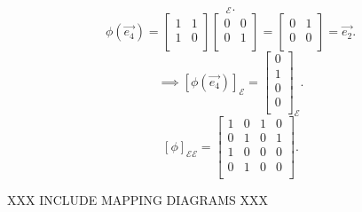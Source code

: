 \documentclass{report}
\begin{document}
{\[        _{ \mathcal{E}} 
        .\]
           \[
           \phi  \left(  \vec{ e_4}  \right) = \begin{bmatrix}
           1 & 1\\
           1 & 0\\
           \end{bmatrix} \begin{bmatrix}
           0 & 0\\
           0 & 1\\
           \end{bmatrix} = \begin{bmatrix}
           0 & 1\\
           0 & 0\\
           \end{bmatrix} = \vec{ e_2} 
           .\] 
           \[
           \implies \left[ \phi \left( \vec{ e_4}  \right)  \right] _{ \mathcal{E}} = \begin{bmatrix}
           0\\
           1\\
           0\\
           0\\
           \end{bmatrix}
            _{ \mathcal{E}}
           .\] 
           \[
            \left[ \phi  \right]_{ \mathcal{E} \mathcal{E}} = \begin{bmatrix}
            1 & 0 & 1 & 0\\
            0 & 1 & 0 & 1\\
            1 & 0 & 0 & 0\\
            0 & 1 & 0 & 0\\
            \end{bmatrix}
           .\] 

    XXX INCLUDE MAPPING DIAGRAMS XXX\\


}
\end{document}
